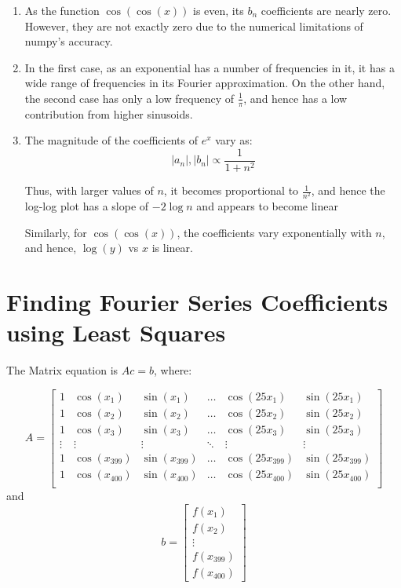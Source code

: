 \documentclass[12pt]{article}
\begin{document}
\begin{enumerate}
    \item As the function $\cos(\cos(x))$ is even, its $b_n$ coefficients are nearly zero. However, they are not exactly zero due to the numerical limitations of numpy's accuracy.
    \item In the first case, as an exponential has a number of frequencies in it, it has a wide range of frequencies in its Fourier approximation. On the other hand, the second case has only a low frequency of $\frac{1}{\pi}$, and hence has a low contribution from higher sinusoids.
    \item The magnitude of the coefficients of $e^x$ vary as:
    $$|a_n|,|b_n|\propto \frac{1}{1+n^2}$$
    
    Thus, with larger values of $n$, it becomes proportional to $\frac{1}{n^2}$, and hence the log-log plot has a slope of $-2\log n$ and appears to become linear
    
    Similarly, for $\cos(\cos(x))$, the coefficients vary exponentially with $n$, and hence, $\log(y)$ vs $x$ is linear.
\end{enumerate}

\pagebreak
\section{Finding Fourier Series Coefficients using Least Squares}
The Matrix equation is $Ac=b$, where:

$$A = \begin{bmatrix}
1 & \cos(x_1) & \sin(x_1) & \dots & \cos(25x_1) & \sin(25x_1) \\
1 & \cos(x_2) & \sin(x_2) & \dots & \cos(25x_2) & \sin(25x_2) \\
1 & \cos(x_3) & \sin(x_3) & \dots & \cos(25x_3) & \sin(25x_3) \\
\vdots & \vdots & \vdots & \ddots & \vdots & \vdots \\
1 & \cos(x_{399}) & \sin(x_{399}) & \dots & \cos(25x_{399}) & \sin(25x_{399}) \\
1 & \cos(x_{400}) & \sin(x_{400}) & \dots & \cos(25x_{400}) & \sin(25x_{400}) \\
\end{bmatrix}
$$
and 
$$b = \begin{bmatrix}
f(x_1) \\
f(x_2) \\
\vdots \\
f(x_{399}) \\
f(x_{400})
\end{bmatrix}
$$
\end{document}
